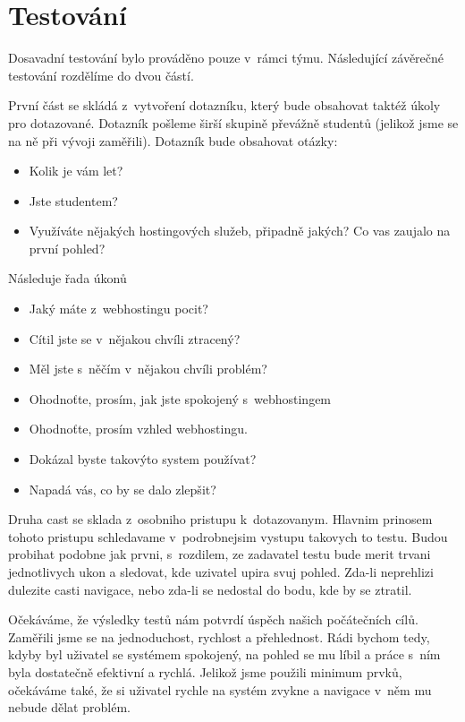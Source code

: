 \documentclass[11pt,a4paper]{article}
\begin{document}
  \section{Testování}
  Dosavadní testování bylo prováděno pouze v~rámci týmu. Následující závěrečné
  testování rozdělíme do dvou částí. 

  První část se skládá z~vytvoření dotazníku, 
  který bude obsahovat taktéž úkoly pro dotazované. Dotazník pošleme širší skupině
  převážně studentů (jelikož jsme se na ně při vývoji zaměřili). Dotazník bude obsahovat otázky:
  
  \begin{itemize}
    \item Kolik je vám let?
    \item Jste studentem?
    \item Využíváte nějakých hostingových služeb, připadně jakých? Co vas zaujalo na první pohled?
  \end{itemize}

  Následuje řada úkonů

  \begin{itemize}
    \item Jaký máte z~webhostingu pocit?
    \item Cítil jste se v~nějakou chvíli ztracený?
    \item Měl jste s~něčím v~nějakou chvíli problém?
    \item Ohodnoťte, prosím, jak jste spokojený s~webhostingem
    \item Ohodnoťte, prosím vzhled webhostingu.
    \item Dokázal byste takovýto system používat?
    \item Napadá vás, co by se dalo zlepšit?
  \end{itemize}

  Druha cast se sklada z~osobniho pristupu k~dotazovanym. Hlavnim prinosem tohoto pristupu 
  schledavame v~podrobnejsim vystupu takovych to testu. Budou probihat podobne jak prvni, 
  s~rozdilem, ze zadavatel testu bude merit trvani jednotlivych ukon a sledovat, kde uzivatel
  upira svuj pohled. Zda-li neprehlizi dulezite casti navigace, nebo zda-li se nedostal 
  do bodu, kde by se ztratil.

  Očekáváme, že výsledky testů nám potvrdí úspěch našich počátečních cílů. Zaměřili jsme se
  na jednoduchost, rychlost a přehlednost. Rádi bychom tedy, kdyby byl uživatel se 
  systémem spokojený, na pohled se mu líbil a práce s~ním byla dostatečně efektivní a rychlá.
  Jelikož jsme použili minimum prvků, očekáváme také, že si uživatel rychle na systém
  zvykne a navigace v~něm mu nebude dělat problém.
\end{document}
